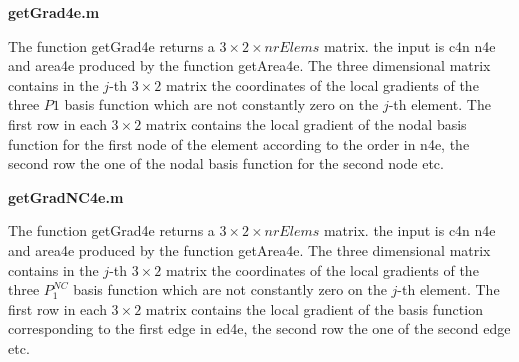 {\bf \large getGrad4e.m}\medskip

The function getGrad4e returns a $3 \times 2 \times nrElems$ matrix. the input is c4n n4e and area4e 
produced by the function getArea4e. The three dimensional matrix contains in the $j$-th $3 \times 2$ matrix 
the coordinates of the local gradients of the three $P1$ basis function which are not constantly zero on 
the $j$-th element. The first row in each $3 \times 2$ matrix contains the local gradient of the nodal basis 
function for the first node of the element according to the order in n4e, the second row the one of the 
nodal basis function for the second node etc.\medskip

{\bf \large getGradNC4e.m}\medskip

The function getGrad4e returns a $3 \times 2 \times nrElems$ matrix. the input is c4n n4e and area4e 
produced by the function getArea4e. The three dimensional matrix contains in the $j$-th $3 \times 2$ matrix 
the coordinates of the local gradients of the three $P_1^{NC}$ basis function which are not constantly zero on 
the $j$-th element. The first row in each $3 \times 2$ matrix contains the local gradient of the basis 
function corresponding to the first edge in ed4e, the second row the one of the second edge
 etc.\medskip

